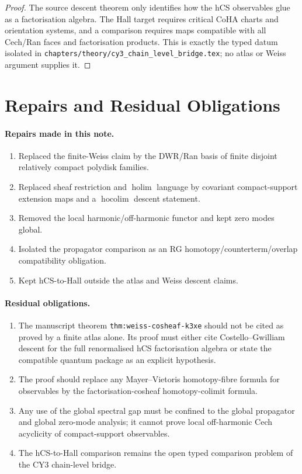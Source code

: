 \documentclass[11pt]{article}
\theoremstyle{definition}
\providecommand{\hocolim}{\operatorname*{hocolim}}
\providecommand{\holim}{\operatorname*{holim}}
\begin{document}
\begin{proof}
The source descent theorem only identifies how the hCS observables glue
as a factorisation algebra. The Hall target requires critical CoHA
charts and orientation systems, and a comparison requires maps
compatible with all Cech/Ran faces and factorisation products. This is
exactly the typed datum isolated in
\texttt{chapters/theory/cy3\_chain\_level\_bridge.tex}; no atlas or
Weiss argument supplies it.
\end{proof}

\section{Repairs and Residual Obligations}
\label{sec:repairs-obligations}

\paragraph{Repairs made in this note.}
\begin{enumerate}
\item Replaced the finite-Weiss claim by the DWR/Ran basis of finite
disjoint relatively compact polydisk families.
\item Replaced sheaf restriction and $\holim$ language by covariant
compact-support extension maps and a $\hocolim$ descent statement.
\item Removed the local harmonic/off-harmonic functor and kept zero
modes global.
\item Isolated the propagator comparison as an RG
homotopy/counterterm/overlap compatibility obligation.
\item Kept hCS-to-Hall outside the atlas and Weiss descent claims.
\end{enumerate}

\paragraph{Residual obligations.}
\begin{enumerate}
\item The manuscript theorem
\texttt{thm:weiss-cosheaf-k3xe} should not be cited as proved by a
finite atlas alone. Its proof must either cite Costello--Gwilliam
descent for the full renormalised hCS factorisation algebra or state
the compatible quantum package as an explicit hypothesis.
\item The proof should replace any Mayer--Vietoris homotopy-fibre
formula for observables by the factorisation-cosheaf homotopy-colimit
formula.
\item Any use of the global spectral gap must be confined to the global
propagator and global zero-mode analysis; it cannot prove local
off-harmonic Cech acyclicity of compact-support observables.
\item The hCS-to-Hall comparison remains the open typed comparison
problem of the CY3 chain-level bridge.
\end{enumerate}
\end{document}
